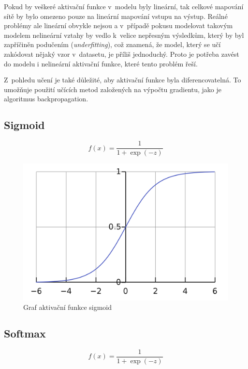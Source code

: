 Pokud by veškeré aktivační funkce v~modelu byly lineární, tak celkové mapování sítě by bylo omezeno pouze na lineární mapování vstupu na výstup. Reálné problémy ale lineární obvykle nejsou a v~případě pokusu modelovat takovým modelem nelineární vztahy by vedlo k~velice nepřesným výsledkům, který by byl zapříčiněn podučením (\textit{underfitting}), což znamená, že model, který se učí zakódovat nějaký vzor v~datasetu, je příliš jednoduchý. Proto je potřeba zavést do modelu i nelineární aktivační funkce, které tento problém řeší\cite[p.~77--78]{mitdeeplearning_small}.

Z~pohledu učení je také důležité, aby aktivační funkce byla diferencovatelná. To umožňuje použití učících metod založených na výpočtu gradientu, jako je algoritmus backpropagation.



\subsection*{Sigmoid}
\begin{equation}
  f(x) = \frac{1}{1+\exp(-z)}
\end{equation}


\begin{figure}[H]
    \centering
    \includegraphics[scale=0.18]{obrazky-figures/sigmoid.png}
    \caption{\label{fig:sigmoid}Graf aktivační funkce sigmoid}
\end{figure}



\subsection*{Softmax}
\begin{equation}
  f(x) = \frac{1}{1+\exp(-z)}
\end{equation}

